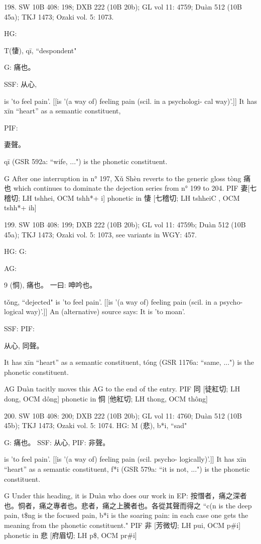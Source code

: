 {198. SW 10B 408: 198; DXB 222 (10B 20b); GL vol 11: 4759; Duàn 512 (10B 45a); TKJ 1473; Ozaki vol. 5: 1073.


HG:

T(悽), qī, ``despondent"

G:	痛也。

SSF: 从心,

is 'to feel pain'. [[is '(a way of) feeling pain (scil. in a psychologi- cal way)'.]]
It has xīn ``heart'' as a semantic constituent,

PIF:

妻聲。

qī (GSR 592a: ``wife, ...") is the phonetic constituent.

G	After one interruption in n° 197, Xǔ Shèn reverts to the generic gloss tòng 痛也 which continues to dominate the dejection series from n° 199 to 204.
PIF     妻[七稽切; LH tshhei, OCM tshh*+ i] phonetic in 悽 [七稽切; LH tshheiC , OCM tshh*+ ih]

199. SW 10B 408: 199; DXB 222 (10B 20b); GL vol 11: 4759b; Duàn 512 (10B 45a); TKJ 1473; Ozaki vol. 5: 1073, see
variants in WGY: 457.


HG:
G:

AG:

9 (恫),
痛也。
一曰:
呻吟也。


tǒng, ``dejected"
is 'to feel pain'. [[is '(a way of) feeling pain (scil. in a psycho- logical way)'.]]
An (alternative) source says: It is 'to moan'.




SSF: PIF:

从心, 同聲。

It has xīn ``heart'' as a semantic constituent,
tóng (GSR 1176a: ``same, ...") is the phonetic constituent.

AG	Duàn tacitly moves this AG to the end of the entry.
PIF     同 [徒紅切; LH dong, OCM dông] phonetic in 恫 [他紅切; LH thong, OCM thông]

200. SW 10B 408: 200; DXB 222 (10B 20b); GL vol 11: 4760; Duàn 512 (10B 45b); TKJ 1473; Ozaki vol. 5: 1074.
HG: M (悲), b*i, ``sad"

G:	痛也。
SSF: 从心,
PIF: 非聲。

is 'to feel pain'. [[is '(a way of) feeling pain (scil. psycho- logically)'.]]
It has xīn ``heart'' as a semantic constituent,
f*i (GSR 579a: ``it is not, ...") is the phonetic constituent.

G    Under this heading, it is Duàn who does our work in EP: 按憯者，痛之深者也。恫者，痛之專者也。悲者，痛之上騰者也。各從其聲而得之 ``c(n is the deep pain, t\$ng is the focused pain, b*i is the soaring pain: in each case one gets the meaning from the phonetic constituent."
PIF   非 [芳微切; LH pui, OCM p\#i] phonetic in 悲 [府眉切; LH p\$, OCM pr\#i]

}
